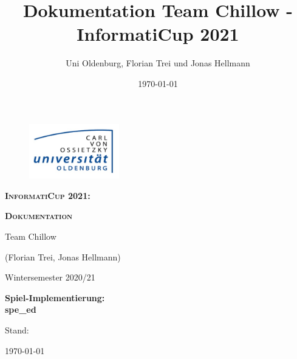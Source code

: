 \documentclass[xcolor=dvipsnames,12pt,a4paper,oneside]{book}
\author{Uni Oldenburg, Florian Trei und Jonas Hellmann}
\date{\today}
\title{Dokumentation Team Chillow - InformatiCup 2021}
\begin{document}
\lstset{language=Python}

\begin{titlepage}
\pagestyle{empty}
\begin{center}


\begin{figure}[H]
\centering
\includegraphics[width=0.35\textwidth]{Logo.jpg}
\end{figure}

\bigskip \bigskip \noindent
\textsc{\textbf{\LARGE InformatiCup 2021:}} \par \bigskip \noindent
\textsc{\textbf{\LARGE Dokumentation}}


\par \bigskip \bigskip \bigskip \bigskip \bigskip \noindent
{\Large Team Chillow} \par \medskip \noindent
{\Large (Florian Trei, Jonas Hellmann)} \par \medskip \noindent




\par \bigskip \bigskip \bigskip \bigskip \bigskip \bigskip \noindent
\begin{center} \Large Wintersemester 2020/21 \end{center}


\par \bigskip \bigskip \bigskip \bigskip \bigskip \bigskip \noindent
\textsf{\textbf{Spiel-Implementierung:\\spe\_ed}} \par \noindent
\textsf{\textbf{}}\par
\bigskip


\bigskip\bigskip\bigskip\bigskip\bigskip\noindent
Stand:\par\noindent
\today


\end{center}
\end{titlepage}



\tableofcontents
\clearpage
\end{document}
